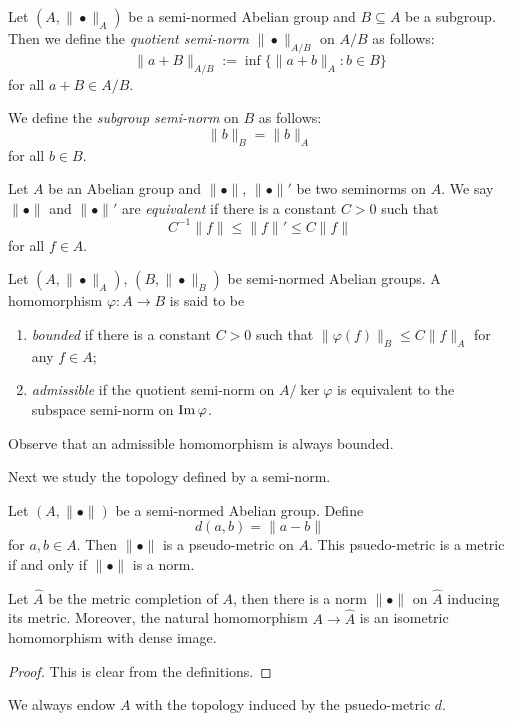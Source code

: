 \begin{definition}\label{def-quotsubsemnorm}
    Let $(A,\|\bullet\|_A)$ be a semi-normed Abelian group and $B\subseteq A$ be a subgroup. Then we define the \emph{quotient semi-norm} $\|\bullet\|_{A/B}$ on $A/B$ as follows:
    \[
      \|a+B\|_{A/B}:=\inf\{\|a+b\|_A:b\in B\}  
    \]
    for all $a+B\in A/B$.

    We define the \emph{subgroup semi-norm} on $B$ as follows:
    \[
        \|b\|_B=\|b\|_A
    \]
    for all $b\in B$.
\end{definition}

\begin{definition}
    Let $A$ be an Abelian group and $\|\bullet\|$, $\|\bullet\|'$ be two seminorms on $A$. We say $\|\bullet\|$ and $\|\bullet\|'$ are \emph{equivalent} if there is a constant $C>0$ such that
    \[
      C^{-1}\|f\|\leq \|f\|'\leq C\|f\|   
    \]
    for all $f\in A$.
\end{definition}

\begin{definition}\label{def-admissiblemorphism}
    Let $(A,\|\bullet\|_A)$, $(B,\|\bullet\|_B)$ be semi-normed Abelian groups. A homomorphism $\varphi:A\rightarrow B$ is said to be 
    \begin{enumerate}
        \item \emph{bounded} if there is a constant $C>0$ such that $\|\varphi(f)\|_B\leq C \|f\|_{A}$ for any $f\in A$;
        \item \emph{admissible} if the quotient semi-norm on $A/\ker \varphi$ is equivalent to the subspace semi-norm on $\operatorname{Im} \varphi$.
    \end{enumerate}
\end{definition}
Observe that an admissible homomorphism is always bounded.

Next we study the topology defined by a semi-norm.
\begin{lemma}\label{lma-pmetricinducedbyseminorm}
    Let $(A,\|\bullet\|)$ be a semi-normed Abelian group. Define
    \[
      d(a,b)=\|a-b\|  
    \]
    for $a,b\in A$. Then $\|\bullet\|$ is a pseudo-metric on $A$. This psuedo-metric is a metric if and only if $\|\bullet\|$ is a norm.

    Let $\hat{A}$ be the metric completion of $A$, then there is a norm $\|\bullet\|$ on $\hat{A}$ inducing its metric. Moreover, the natural homomorphism $A\rightarrow \hat{A}$ is an isometric homomorphism with dense image.
\end{lemma}
\begin{proof}
    This is clear from the definitions.
\end{proof}
We always endow $A$ with the topology induced by the psuedo-metric $d$.

